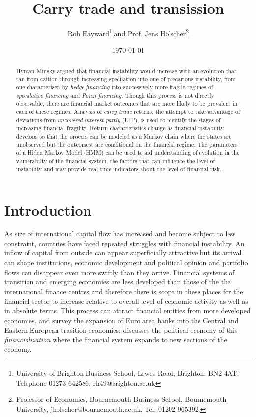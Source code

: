 \documentclass[12pt, a4paper, oneside]{article} %
\begin{document}
\title{Carry trade and transission}
\author{Rob Hayward\footnote{University of Brighton Business School, Lewes Road, Brighton, BN2 4AT; Telephone 01273 642586.  rh49@brighton.ac.uk} and Prof. Jens H\"{o}lscher\footnote{Professor of Economics, Bournemouth Business School, Bournemouth University, jholscher@bournemouth.ac.uk, Tel: 01202 965392.}} 
\date{\today}
\maketitle
\begin{abstract}
Hyman Minsky argued that financial instability would increase with an evolution that ran from caition through increasing specilation into one of precarious instability, from one characterised by \emph{hedge financing} into successively more fragile regimes of \emph{speculative financing} and \emph{Ponzi financing}.  Though this process is not directly observable, there are financial market outcomes that are more likely to be prevalent in each of these regimes.  Analysis of \emph{carry trade} returns, the attempt to take advantage of deviations from \emph{uncovered interest partiy} (UIP), is used to identify the stages of increasing financial fragility.  Return characteristics change as financial instability develops so that the process can be modeled as a Markov chain where the states are unobserved but the outcomest are conditional on  the financial regime.  The parameters of a Hiden Markov Model (HMM) can be used to aid understanding of evolution in the vlunerabilty of the financial system, the factors that can influence the level of instability and may provide real-time indicators about the level of financial risk. 

\end{abstract}

\section{Introduction}
As size of international capital flow has increased and become subject to less constraint, countries have faced repeated struggles with financial instability.  An inflow of capital from outside can appear superficially attractive but its arrival can shape institutions, economic development and political opinion and portfolio flows can disappear even more swiftly than they arrive.  Financial systems of transition and emerging economies are less developed than those of the the international finance centres and therefore there is scope in these places for the financial sector to increase relative to overall level of economic activity as well as in absolute terms.  This process can attract financial entities from more developed economies. \citet{ONBcarry} and \citet{EBRD} survey the expansion of Euro area banks into the Central and Eastern European trasition economies; \citet{Gabor} discusses the political economy of this \emph{financialization} where the financial system expands to new sections of the economy.  
\end{document}
